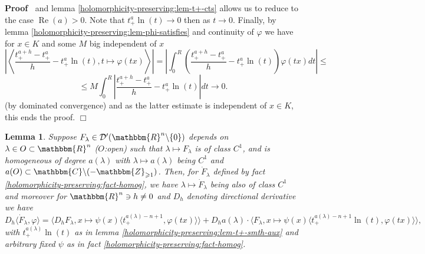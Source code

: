 \documentclass{article}
\newcommand{\tmop}[1]{\ensuremath{\operatorname{#1}}}
\newenvironment{proof}{\noindent\textbf{Proof\ }}{\hspace*{\fill}$\Box$\medskip}
\numberwithin{definition}{section}
\newtheorem{lemma}{Lemma}
\numberwithin{lemma}{section}
\numberwithin{proposition}{section}
{\theorembodyfont{\rmfamily}\newtheorem{remark}{Remark}
\numberwithin{remark}{section}
}
\begin{document}
\begin{proof}
  and lemma \ref{holomorphicity-preserving:lem-t+-cts} allows us to reduce to
  the case $\tmop{Re} ( a) > 0$. Note that $t_+^a \ln ( t) \rightarrow 0$ then
  as $t \rightarrow 0$. Finally, by lemma
  \ref{holomorphicity-preserving:lem-phi-satisfies} and continuity of
  $\varphi$ we have for $x \in K$ and some $M$ big independent of $x$
  \[ \left| \left\langle \frac{t_+^{a + h} - t_+^a}{h} - t_+^a \ln ( t), t
     \mapsto \varphi ( t x) \right\rangle \right| = \left| \int_0^R \left(
     \frac{t_+^{a + h} - t_+^a}{h} - t_+^a \ln ( t) \right) \varphi ( t x) d t
     \right| \leqslant \]
  \[ \leqslant M \int_0^R \left| \frac{t_+^{a + h} - t_+^a}{h} - t_+^a \ln (
     t) \right| d t \rightarrow 0. \]
  (by dominated convergence) and as the latter estimate is independent of $x
  \in K$, this ends the proof.
\end{proof}

\begin{lemma}
  \label{holomorphicity-preserving:lem-t+-smth}Suppose $F_{\lambda} \in
  \mathcal{D}' ( \mathbbm{R}^n \backslash \{ 0 \})$ depends on $\lambda \in O
  \subset \mathbbm{R}^n$ ($O$:open) such that $\lambda \mapsto F_{\lambda}$ is
  of class $C^1$, and is homogeneous of degree $a ( \lambda)$ with $\lambda
  \mapsto a ( \lambda)$ being $C^1$ and $a ( O) \subset \mathbbm{C}\backslash
  ( -\mathbbm{Z}_{\geqslant 1})$. Then, for $\dot{F}_{\lambda}$ defined by
  fact \ref{holomorphicity-preserving:fact-homog}, we have $\lambda \mapsto
  \dot{F}_{\lambda}$ being also of class $C^1$ and moreover for $\mathbbm{R}^n
  \ni h \neq 0$ and $D_h$ denoting directional derivative we have
  \begin{equation}
    \label{holomorphicity-preserving:eq-1} D_h \langle \dot{F}_{\lambda},
    \varphi \rangle = \langle D_h F_{\lambda}, x \mapsto \psi ( x) \langle
    t^{a ( \lambda) - n + 1}_+, \varphi ( t x) \rangle \rangle + D_h a (
    \lambda) \cdot \langle F_{\lambda}, x \mapsto \psi ( x) \langle t_+^{a (
    \lambda) - n + 1} \ln ( t), \varphi ( t x) \rangle \rangle,
  \end{equation}
  with $t_+^{a ( \lambda)} \ln ( t)$ as in lemma
  \ref{holomorphicity-preserving:lem-t+-smth-aux} and arbitrary fixed $\psi$
  as in fact \ref{holomorphicity-preserving:fact-homog}.
\end{lemma}
\end{document}
